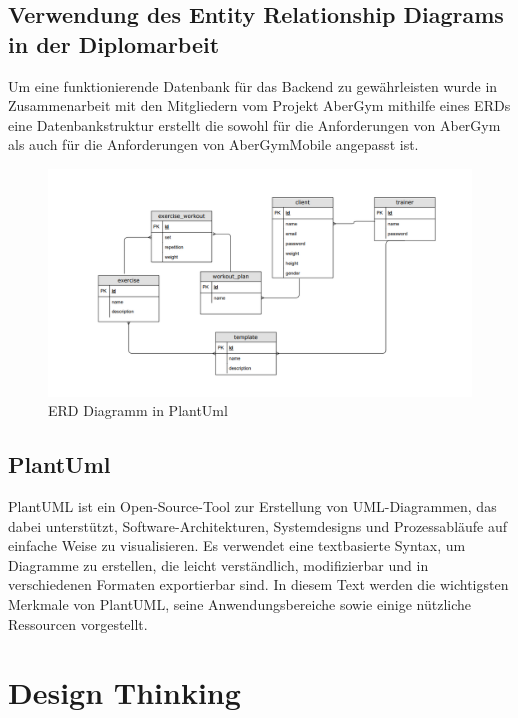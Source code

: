         \pagebreak

    \subsection{Verwendung des Entity Relationship Diagrams in der Diplomarbeit}

    Um eine funktionierende Datenbank für das Backend zu gewährleisten wurde in Zusammenarbeit mit den Mitgliedern vom Projekt AberGym  mithilfe eines ERDs eine Datenbankstruktur erstellt die sowohl für die Anforderungen von AberGym als auch für die Anforderungen von AberGymMobile angepasst ist.

    \begin{figure}[H]
        \centering
        \includegraphics[scale=0.6]{pics/erd plantuml.png}
        \caption{ERD Diagramm in PlantUml}
    \end{figure}

    \subsection{PlantUml}
    PlantUML \cite{PlantUML} ist ein Open-Source-Tool zur Erstellung von UML-Diagrammen, das dabei unterstützt, Software-Architekturen, Systemdesigns und Prozessabläufe auf einfache Weise zu visualisieren. Es verwendet eine textbasierte Syntax, um Diagramme zu erstellen, die leicht verständlich, modifizierbar und in verschiedenen Formaten exportierbar sind. In diesem Text werden die wichtigsten Merkmale von PlantUML, seine Anwendungsbereiche sowie einige nützliche Ressourcen vorgestellt.

    \pagebreak
    \section{Design Thinking}


